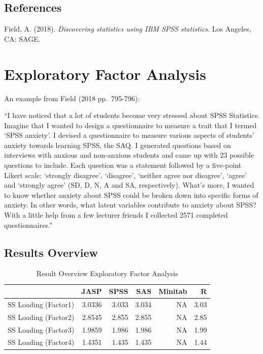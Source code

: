\documentclass[
]{book}
\begin{document}
\hypertarget{references}{%
\subsection{References}\label{references}}

Field, A. (2018). \emph{Discovering statistics using IBM SPSS statistics}. Los Angeles, CA: SAGE.

\hypertarget{exploratory-factor-analysis}{%
\section{Exploratory Factor Analysis}\label{exploratory-factor-analysis}}

An example from Field (2018 pp.~795-796):

``I have noticed that a lot of students become very stressed about SPSS Statistics. Imagine that I wanted to design a questionnaire to measure a trait that I termed `SPSS anxiety'. I devised a questionnaire to measure various aspects of students' anxiety towards learning SPSS, the SAQ. I generated questions based on interviews with anxious and non-anxious students and came up with 23 possible questions to include. Each question was a statement followed by a five-point Likert scale: `strongly disagree', `disagree', `neither agree nor disagree', `agree' and `strongly agree' (SD, D, N, A and SA, respectively). What's more, I wanted to know whether anxiety about SPSS could be broken down into specific forms of anxiety. In other words, what latent variables contribute to anxiety about SPSS? With a little help from a few lecturer friends I collected 2571 completed questionnaires.''

\hypertarget{results-overview-1}{%
\subsection{Results Overview}\label{results-overview-1}}

\begin{table}

\caption{\label{tab:unnamed-chunk-121}Result Overview Exploratory Factor Analysis}
\centering
\begin{tabular}[t]{lrrrrr}
\toprule
  & JASP & SPSS & SAS & Minitab & R\\
\midrule
SS Loading (Factor1) & 3.0336 & 3.033 & 3.034 & NA & 3.03\\
SS Loading (Factor2) & 2.8545 & 2.855 & 2.855 & NA & 2.85\\
SS Loading (Factor3) & 1.9859 & 1.986 & 1.986 & NA & 1.99\\
SS Loading (Factor4) & 1.4351 & 1.435 & 1.435 & NA & 1.44\\
\bottomrule
\end{tabular}
\end{table}
\end{document}
